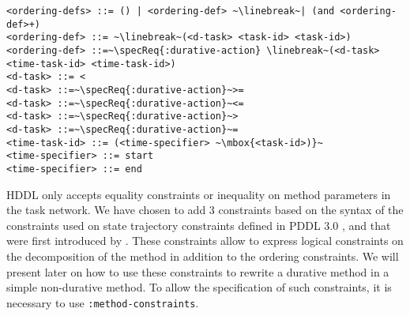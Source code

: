 \documentclass{article}
\begin{document}
\begin{lstlisting}[firstnumber=last, escapechar=~]
<ordering-defs> ::= () | <ordering-def> ~\linebreak~| (and <ordering-def>+)
<ordering-def> ::= ~\linebreak~(<d-task> <task-id> <task-id>)
<ordering-def> ::=~\specReq{:durative-action} \linebreak~(<d-task> <time-task-id> <time-task-id>)
<d-task> ::= <
<d-task> ::=~\specReq{:durative-action}~>=
<d-task> ::=~\specReq{:durative-action}~<=
<d-task> ::=~\specReq{:durative-action}~>
<d-task> ::=~\specReq{:durative-action}~=
<time-task-id> ::= (<time-specifier> ~\mbox{<task-id>)}~ 
<time-specifier> ::= start
<time-specifier> ::= end
\end{lstlisting}

%
%
HDDL only accepts equality constraints or inequality on method parameters in the task network. We have chosen to add 3 constraints based on the syntax of the constraints used on state trajectory constraints defined in PDDL 3.0 \citep{gerevini:05}, and that were first introduced by \cite{Erol94}. These constraints allow to express logical constraints on the decomposition of the method in addition to the ordering constraints. We will present later on %
how to use these constraints to rewrite a durative method in a simple non-durative method. To allow the specification of such constraints, it is necessary to use \verb+:method-constraints+.
\end{document}
